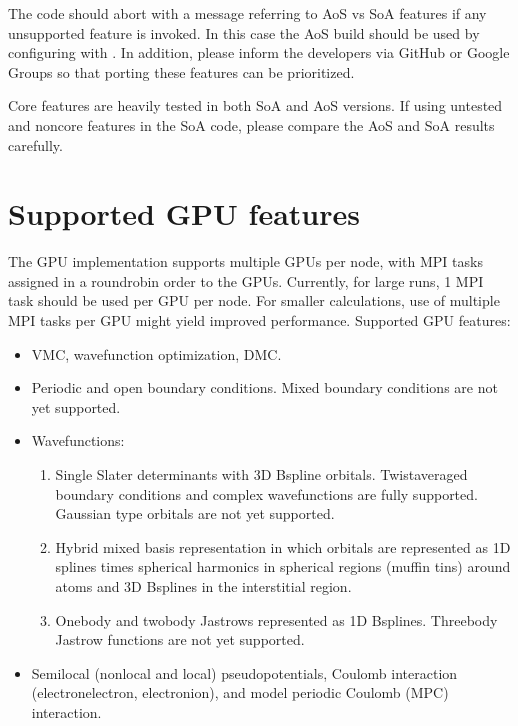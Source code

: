 \documentclass[letterpaper,10pt,english]{sphinxmanual}
\begin{document}
The code should abort with a message referring to AoS vs SoA features if
any unsupported feature is invoked. In this case the AoS build should be
used by configuring with . In addition, please inform the developers via
GitHub or Google Groups so that porting these features can be
prioritized.

Core features are heavily tested in both SoA and AoS versions. If using
untested and noncore features in the SoA code, please compare the AoS
and SoA results carefully.


\section{Supported GPU features}
\label{\detokenize{features:supported-gpu-features}}
The GPU implementation supports multiple GPUs per node, with MPI tasks
assigned in a round\sphinxhyphen{}robin order to the GPUs. Currently, for large runs,
1 MPI task should be used per GPU per node. For smaller calculations,
use of multiple MPI tasks per GPU might yield improved performance.
Supported GPU features:
\begin{itemize}
\item {} 
VMC, wavefunction optimization, DMC.

\item {} 
Periodic and open boundary conditions. Mixed boundary conditions are
not yet supported.

\item {} 
Wavefunctions:
\begin{enumerate}
%
\item {} 
Single Slater determinants with 3D B\sphinxhyphen{}spline orbitals.
Twist\sphinxhyphen{}averaged boundary conditions and complex wavefunctions are
fully supported. Gaussian type orbitals are not yet supported.

\item {} 
Hybrid mixed basis representation in which orbitals are
represented as 1D splines times spherical harmonics in spherical
regions (muffin tins) around atoms and 3D B\sphinxhyphen{}splines in the
interstitial region.

\item {} 
One\sphinxhyphen{}body and two\sphinxhyphen{}body Jastrows represented as 1D B\sphinxhyphen{}splines.
Three\sphinxhyphen{}body Jastrow functions are not yet supported.

\end{enumerate}

\item {} 
Semilocal (nonlocal and local) pseudopotentials, Coulomb interaction
(electron\sphinxhyphen{}electron, electron\sphinxhyphen{}ion), and model periodic Coulomb (MPC)
interaction.

\end{itemize}
\end{document}
